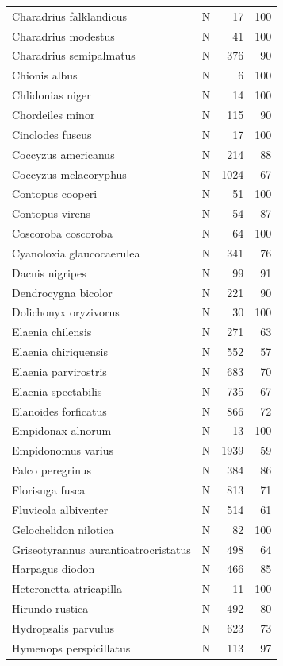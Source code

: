 \documentclass[
]{scrbook}
\begin{document}
\begin{table}
\begin{tabular}{llrr}
\addlinespace
Charadrius falklandicus & N & 17 & 100\\
Charadrius modestus & N & 41 & 100\\
Charadrius semipalmatus & N & 376 & 90\\
Chionis albus & N & 6 & 100\\
Chlidonias niger & N & 14 & 100\\
\addlinespace
Chordeiles minor & N & 115 & 90\\
Cinclodes fuscus & N & 17 & 100\\
Coccyzus americanus & N & 214 & 88\\
Coccyzus melacoryphus & N & 1024 & 67\\
Contopus cooperi & N & 51 & 100\\
\addlinespace
Contopus virens & N & 54 & 87\\
Coscoroba coscoroba & N & 64 & 100\\
Cyanoloxia glaucocaerulea & N & 341 & 76\\
Dacnis nigripes & N & 99 & 91\\
Dendrocygna bicolor & N & 221 & 90\\
\addlinespace
Dolichonyx oryzivorus & N & 30 & 100\\
Elaenia chilensis & N & 271 & 63\\
Elaenia chiriquensis & N & 552 & 57\\
Elaenia parvirostris & N & 683 & 70\\
Elaenia spectabilis & N & 735 & 67\\
\addlinespace
Elanoides forficatus & N & 866 & 72\\
Empidonax alnorum & N & 13 & 100\\
Empidonomus varius & N & 1939 & 59\\
Falco peregrinus & N & 384 & 86\\
Florisuga fusca & N & 813 & 71\\
\addlinespace
Fluvicola albiventer & N & 514 & 61\\
Gelochelidon nilotica & N & 82 & 100\\
Griseotyrannus aurantioatrocristatus & N & 498 & 64\\
Harpagus diodon & N & 466 & 85\\
Heteronetta atricapilla & N & 11 & 100\\
\addlinespace
Hirundo rustica & N & 492 & 80\\
Hydropsalis parvulus & N & 623 & 73\\
Hymenops perspicillatus & N & 113 & 97\\

\end{tabular}
\end{table}
\end{document}
